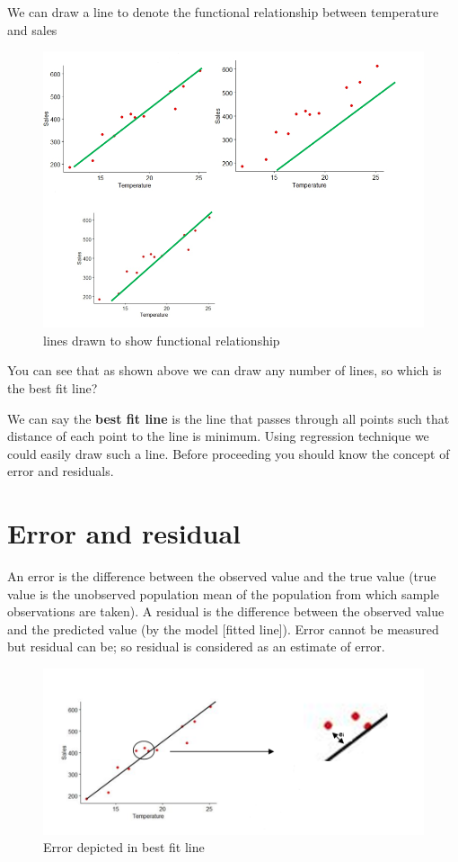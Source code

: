 \documentclass[
]{book}
\begin{document}
We can draw a line to denote the functional relationship between temperature and sales

\begin{figure}

{\centering \includegraphics[width=0.5\linewidth]{images/r99} 

}

\caption{lines drawn to show functional relationship}\label{fig:r2}
\end{figure}

You can see that as shown above we can draw any number of lines, so
which is the best fit line?

We can say the \textbf{best fit line} is the line that passes through all
points such that distance of each point to the line is minimum. Using
regression technique we could easily draw such a line. Before proceeding
you should know the concept of error and residuals.

\hypertarget{error-and-residual}{%
\section{Error and residual}\label{error-and-residual}}

An error is the difference between the observed value and the true value
(true value is the unobserved population mean of the population from
which sample observations are taken). A residual is the difference
between the observed value and the predicted value (by the model
{[}fitted line{]}). Error cannot be measured but residual can be; so
residual is considered as an estimate of error.

\begin{figure}

{\centering \includegraphics[width=0.5\linewidth]{images/r91} 

}

\caption{Error depicted in best fit line }\label{fig:r3}
\end{figure}
\end{document}

